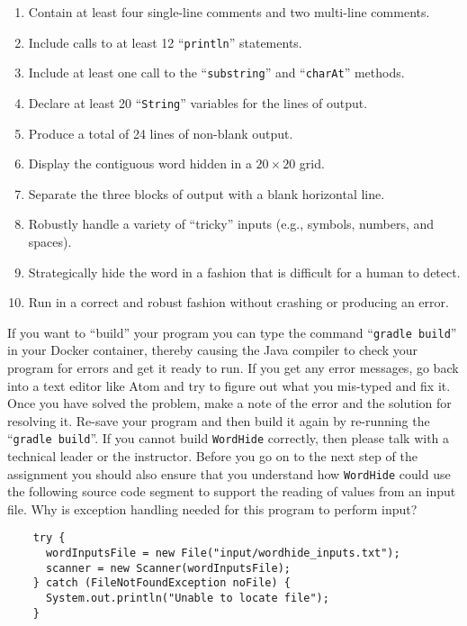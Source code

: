 \documentclass[11pt]{article}
\newcommand{\mainprogram}{\lstinline{WordHide}}
\newcommand{\gradlebuild}{\command{gradle build}}
\newcommand{\command}[1]{``\lstinline{#1}''}
\newcommand{\step}[1]{``{#1}''}
\begin{document}
\vspace*{-.1in}
\begin{enumerate}
  \setlength{\itemsep}{0pt}

\item Contain at least four single-line comments and two multi-line comments.
\item Include calls to at least 12 \command{println} statements.
\item Include at least one call to the \command{substring} and \command{charAt} methods.
\item Declare at least 20 \command{String} variables for the lines of output.
\item Produce a total of 24 lines of non-blank output.
\item Display the contiguous word hidden in a $20 \times 20$ grid.
\item Separate the three blocks of output with a blank horizontal line.
\item Robustly handle a variety of ``tricky'' inputs (e.g., symbols, numbers,
  and spaces).
\item Strategically hide the word in a fashion that is difficult for a human
  to detect.
\item Run in a correct and robust fashion without crashing or producing an error.

\end{enumerate}
\vspace*{-.1in}

If you want to \step{build} your program you can type the command \gradlebuild{}
in your Docker container, thereby causing the Java compiler to check your
program for errors and get it ready to run. If you get any error messages, go
back into a text editor like Atom and try to figure out what you mis-typed and
fix it. Once you have solved the problem, make a note of the error and the
solution for resolving it. Re-save your program and then build it again by
re-running the \gradlebuild{}. If you cannot build \mainprogram{} correctly,
then please talk with a technical leader or the instructor. Before you go on to
the next step of the assignment you should also ensure that you understand how
\mainprogram{} could use the following source code segment to support the
reading of values from an input file. Why is exception handling needed for this
program to perform input?

\vspace*{-.1in}
\begin{verbatim}
    try {
      wordInputsFile = new File("input/wordhide_inputs.txt");
      scanner = new Scanner(wordInputsFile);
    } catch (FileNotFoundException noFile) {
      System.out.println("Unable to locate file");
    }
\end{verbatim}
\vspace*{-.1in}
\end{document}
